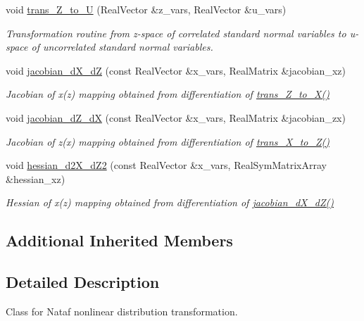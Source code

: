 \begin{DoxyCompactItemize}
void \hyperlink{classPecos_1_1NatafTransformation_a228064f2ee23ccf3fae3c9ead6b173a5}{trans\+\_\+\+Z\+\_\+to\+\_\+U} (Real\+Vector \&z\+\_\+vars, Real\+Vector \&u\+\_\+vars)
\begin{DoxyCompactList}\small\item\em Transformation routine from z-\/space of correlated standard normal variables to u-\/space of uncorrelated standard normal variables. \end{DoxyCompactList}\item 
void \hyperlink{classPecos_1_1NatafTransformation_aea9f6918e7726d5ea6d1484d5eefc4f0}{jacobian\+\_\+d\+X\+\_\+dZ} (const Real\+Vector \&x\+\_\+vars, Real\+Matrix \&jacobian\+\_\+xz)
\begin{DoxyCompactList}\small\item\em Jacobian of x(z) mapping obtained from differentiation of \hyperlink{classPecos_1_1NatafTransformation_a5feeecf846fc017c5a28eccb4e955dc1}{trans\+\_\+\+Z\+\_\+to\+\_\+\+X()} \end{DoxyCompactList}\item 
void \hyperlink{classPecos_1_1NatafTransformation_afe2c6f555bc8e5134f610e503aed26dd}{jacobian\+\_\+d\+Z\+\_\+dX} (const Real\+Vector \&x\+\_\+vars, Real\+Matrix \&jacobian\+\_\+zx)
\begin{DoxyCompactList}\small\item\em Jacobian of z(x) mapping obtained from differentiation of \hyperlink{classPecos_1_1NatafTransformation_a08fa15c70e2b4933fe20a1956df8be45}{trans\+\_\+\+X\+\_\+to\+\_\+\+Z()} \end{DoxyCompactList}\item 
void \hyperlink{classPecos_1_1NatafTransformation_a18dce9172d436bd04d8e32229dbe8c5b}{hessian\+\_\+d2\+X\+\_\+d\+Z2} (const Real\+Vector \&x\+\_\+vars, Real\+Sym\+Matrix\+Array \&hessian\+\_\+xz)
\begin{DoxyCompactList}\small\item\em Hessian of x(z) mapping obtained from differentiation of \hyperlink{classPecos_1_1NatafTransformation_aea9f6918e7726d5ea6d1484d5eefc4f0}{jacobian\+\_\+d\+X\+\_\+d\+Z()} \end{DoxyCompactList}\end{DoxyCompactItemize}
\subsection*{Additional Inherited Members}


\subsection{Detailed Description}
Class for Nataf nonlinear distribution transformation. 

